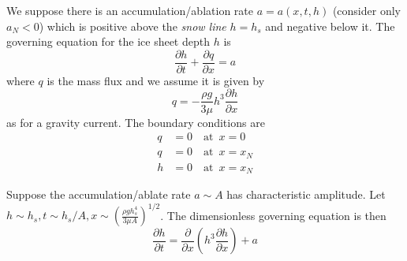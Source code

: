 \documentclass{jknotes}
\begin{document}
We suppose there is an accumulation/ablation rate $a=a(x,t,h)$ (consider only
$a_N < 0$) which is positive above the \emph{snow line} $h = h_s$ and negative
below it. The governing equation for the ice sheet depth $h$ is
\begin{equation}
	\frac{\partial h}{\partial t} + \frac{\partial q}{\partial x} = a
\end{equation}
where $q$ is the mass flux and we assume it is given by
\begin{equation}
	q = -\frac{\rho g}{3\mu} h^3 \frac{\partial h}{\partial x}
\end{equation}
as for a gravity current. The boundary conditions are
\begin{align}
	q &= 0 \hspace{1em} \text{at}\,\,\, x=0 \\
	q &= 0 \hspace{1em} \text{at}\,\,\, x=x_N \\
	h &= 0 \hspace{1em} \text{at}\,\,\, x=x_N
\end{align}

Suppose the accumulation/ablate rate $a \sim A$ has characteristic amplitude.
Let $h \sim h_s, t \sim h_s/A, x \sim \left(\frac{\rho g h_s^4}{3\mu
A}\right)^{1/2}$. The dimensionless governing equation is then
\begin{equation}
	\frac{\partial h}{\partial t} = \frac{\partial}{\partial x} \left( h^3
	\frac{\partial h}{\partial x}\right) + a
\end{equation}
\end{document}
